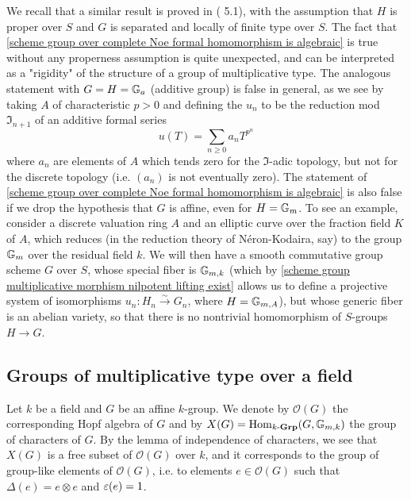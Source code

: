 \begin{remark}
We recall that a similar result is proved in (\cite{EGA3-1}  5.1), with the assumption that $H$ is proper over $S$ and $G$ is separated and locally of finite type over $S$. The fact that \cref{scheme group over complete Noe formal homomorphism is algebraic} is true without any properness assumption is quite unexpected, and can be interpreted as a "rigidity" of the structure of a group of multiplicative type. The analogous statement with $G=H=\mathbb{G}_a$ (additive group) is false in general, as we see by taking $A$ of characteristic $p>0$ and defining the $u_n$ to be the reduction mod $\mathfrak{I}_{n+1}$ of an additive formal series
\[u(T)=\sum_{n\geq 0}a_nT^{p^n}\]
where $a_n$ are elements of $A$ which tends zero for the $\mathfrak{I}$-adic topology, but not for the discrete topology (i.e. $(a_n)$ is not eventually zero). The statement of \cref{scheme group over complete Noe formal homomorphism is algebraic} is also false if we drop the hypothesis that $G$ is affine, even for $H=\mathbb{G}_m$. To see an example, consider a discrete valuation ring $A$ and an elliptic curve over the fraction field $K$ of $A$, which reduces (in the reduction theory of N\'eron-Kodaira, say) to the group $\mathbb{G}_m$ over the residual field $k$. We will then have a smooth commutative group scheme $G$ over $S$, whose special fiber is $\mathbb{G}_{m,k}$ (which by \cref{scheme group multiplicative morphism nilpotent lifting exist} allows us to define a projective system of isomorphisms $u_n:H_n\stackrel{\sim}{\to}G_n$, where $H=\mathbb{G}_{m,A}$), but whose generic fiber is an abelian variety, so that there is no nontrivial homomorphism of $S$-groups $H\to G$.
\end{remark}

\subsection{Groups of multiplicative type over a field}
Let $k$ be a field and $G$ be an affine $k$-group. We denote by $\mathscr{O}(G)$ the corresponding Hopf algebra of $G$ and by $X(G)=\mathrm{Hom}_{k\textup{-}\mathbf{Grp}}(G,\mathbb{G}_{m,k})$ the group of characters of $G$. By the lemma of independence of characters, we see that $X(G)$ is a free subset of $\mathscr{O}(G)$ over $k$, and it corresponds to the group of group-like elements of $\mathscr{O}(G)$, i.e. to elements $e\in\mathscr{O}(G)$ such that $\Delta(e)=e\otimes e$ and $\varepsilon(e)=1$.

